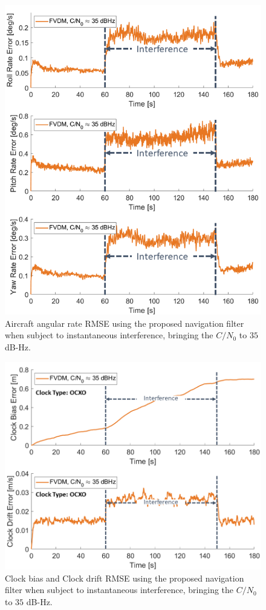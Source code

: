 \documentclass[12pt]{report}
\begin{document}
\begin{figure}[!ht]
  \centering
  \includegraphics[width=0.75\linewidth]{Figures/Results/trajectoryfigure/Slide12.PNG}
  \caption{Aircraft angular rate RMSE using the proposed navigation filter when subject to instantaneous interference, bringing the \(C/N_0\) to \(35\) dB-Hz.}\label{fig:Ang35}
\end{figure}


\begin{figure}[!ht]
  \centering
  \includegraphics[width=0.75\linewidth]{Figures/Results/trajectoryfigure/Slide24.PNG}
  \caption{Clock bias and Clock drift RMSE using the proposed navigation filter when subject to instantaneous interference, bringing the \(C/N_0\) to \(35\) dB-Hz.}\label{fig:Clk35}
\end{figure}
\end{document}
